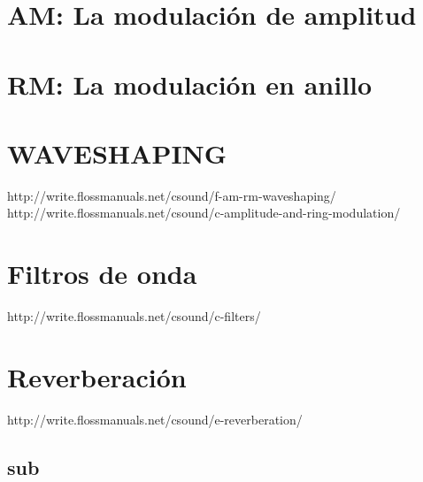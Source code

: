 \section{AM: La modulación de amplitud}

\section{RM: La modulación en anillo}

\section{WAVESHAPING}
http://write.flossmanuals.net/csound/f-am-rm-waveshaping/
http://write.flossmanuals.net/csound/c-amplitude-and-ring-modulation/
\section{Filtros de onda}
http://write.flossmanuals.net/csound/c-filters/
\section{Reverberación}
http://write.flossmanuals.net/csound/e-reverberation/

\subsection{sub}


 

